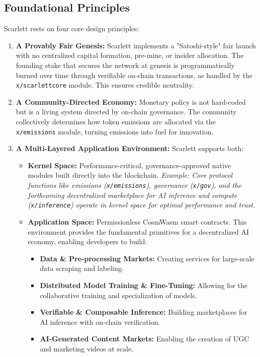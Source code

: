 \documentclass[10pt]{article}
\begin{document}
\subsection{Foundational Principles}
Scarlett rests on four core design principles:
\begin{enumerate}[leftmargin=*, itemsep=2pt]
    \item \textbf{A Provably Fair Genesis:} Scarlett implements a "Satoshi-style" fair launch with no centralized capital formation, pre-mine, or insider allocation. The founding stake that secures the network at genesis is programmatically burned over time through verifiable on-chain transactions, as handled by the \texttt{x/scarlettcore} module. This ensures credible neutrality.
    \item \textbf{A Community-Directed Economy:} Monetary policy is not hard-coded but is a living system directed by on-chain governance. The community collectively determines how token emissions are allocated via the \texttt{x/emissions} module, turning emissions into fuel for innovation.
    \item \textbf{A Multi-Layered Application Environment:}
    Scarlett supports both:
    \begin{itemize}[leftmargin=*, itemsep=2pt]
        \item \textbf{Kernel Space:} Performance-critical, governance-approved native modules built directly into the blockchain. \textit{Example: Core protocol functions like emissions (\texttt{x/emissions}), governance (\texttt{x/gov}), and the forthcoming decentralized marketplace for AI inference and compute (\texttt{x/inference}) operate in kernel space for optimal performance and trust.}
        \item \textbf{Application Space:} Permissionless CosmWasm smart contracts. This environment provides the fundamental primitives for a decentralized AI economy, enabling developers to build:
        \begin{itemize}[leftmargin=*, itemsep=2pt]
            \item \textbf{Data \& Pre-processing Markets:} Creating services for large-scale data scraping and labeling.
            \item \textbf{Distributed Model Training \& Fine-Tuning:} Allowing for the collaborative training and specialization of models.
            \item \textbf{Verifiable \& Composable Inference:} Building marketplaces for AI inference with on-chain verification.
            \item \textbf{AI-Generated Content Markets:} Enabling the creation of UGC and marketing videos at scale.

\end{itemize}
\end{itemize}
\end{enumerate}
\end{document}
